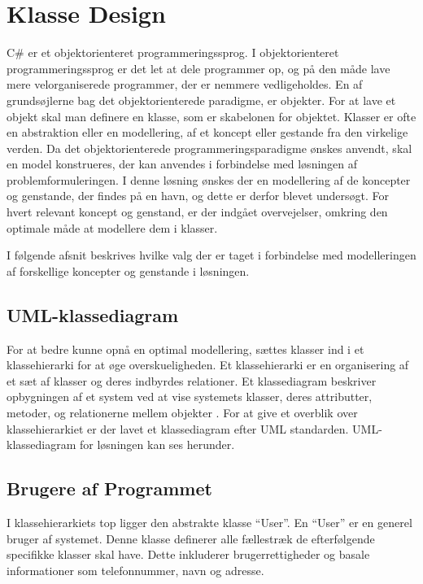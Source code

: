 \section{Klasse Design}
\label{sec:klasse_design}
C\# er et objektorienteret programmeringssprog. I objektorienteret programmeringssprog er det let at dele programmer op, og på den måde lave mere velorganiserede programmer, der er nemmere vedligeholdes. En af grundsøjlerne bag det objektorienterede paradigme, er objekter. For at lave et objekt skal man definere en klasse, som er skabelonen for objektet. Klasser er ofte en abstraktion eller en modellering, af et koncept eller gestande fra den virkelige verden. Da det objektorienterede programmeringsparadigme ønskes anvendt, skal en model konstrueres, der kan anvendes i forbindelse med løsningen af problemformuleringen. I denne løsning ønskes der en modellering af de koncepter og genstande, der findes på en havn, og dette er derfor blevet undersøgt. For hvert relevant koncept og genstand, er der indgået overvejelser, omkring den optimale måde at modellere dem i klasser.

I følgende afsnit beskrives hvilke valg der er taget i forbindelse med modelleringen af forskellige koncepter og genstande i løsningen. 

\subsection{UML-klassediagram}

For at bedre kunne opnå en optimal modellering, sættes klasser ind i et klassehierarki for at øge overskueligheden. Et klassehierarki er en organisering af et sæt af klasser og deres indbyrdes relationer. Et klassediagram beskriver opbygningen af et system ved at vise systemets klasser, deres attributter, metoder, og relationerne mellem objekter \cite{martin2006agile}. For at give et overblik over klassehierarkiet er der lavet et klassediagram efter UML standarden. UML-klassediagram for løsningen kan ses herunder.



\subsection{Brugere af Programmet}
\label{sub:brugere_af_programmet}

I klassehierarkiets top ligger den abstrakte klasse \enquote{User}. En \enquote{User} er en generel bruger af systemet. Denne klasse definerer alle fællestræk de efterfølgende specifikke klasser skal have. Dette inkluderer brugerrettigheder og basale informationer som telefonnummer, navn og adresse.

